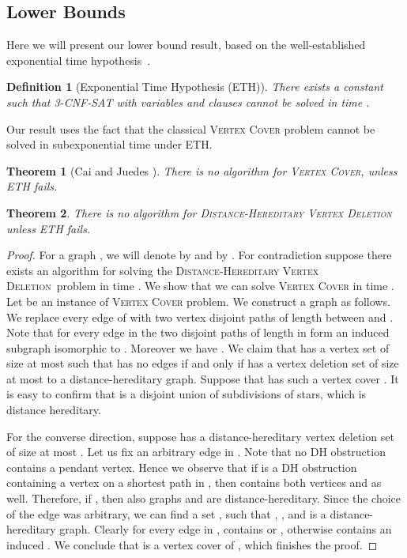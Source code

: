 \documentclass[11pt]{elsarticle}
\newtheorem{theorem}{Theorem}[section]
\newtheorem{definition}{Definition}
\newcommand{\DHVD}{\textsc{Distance-Hereditary Vertex Deletion}}
\begin{document}
\subsection{Lower Bounds}
Here we will present our lower bound result, based on the well-established exponential time hypothesis~\cite{ImpagliazzoRF2001}.

\begin{definition}[Exponential Time Hypothesis (ETH)]
 There exists a constant  such that \textsc{3-CNF-SAT} with  variables and  clauses cannot be solved in time .
\end{definition}

Our result uses the fact that the classical \textsc{Vertex Cover} problem cannot be solved in subexponential time under ETH.
  
\begin{theorem}[Cai and Juedes \cite{CaiJuedes03}]\label{thm:ethVC}
There is no  algorithm for \textsc{Vertex Cover}, unless ETH fails.
\end{theorem}

\begin{theorem}
\label{thm:main3}
There is no  algorithm for \DHVD\, unless ETH fails.
\end{theorem}
\begin{proof}
For a graph , we will denote  by  and  by .
For contradiction suppose there exists an algorithm for solving the \DHVD\ problem in time . We show that we can solve \textsc{Vertex Cover} in time . Let  be an instance of \textsc{Vertex Cover} problem. We construct a graph  as follows. We replace every edge  of  with two vertex disjoint paths of length  between  and . Note that for every edge  in  the two disjoint paths of length  in  form an induced subgraph isomorphic to . Moreover we have . We claim that  has a vertex set  of size at most  such that  has no edges if and only if  has a vertex deletion set of size at most  to a distance-hereditary graph. Suppose that  has such a vertex cover . It is easy to confirm that  is a  disjoint union of subdivisions of stars, which is distance hereditary. 

For the converse direction, suppose  has a distance-hereditary vertex deletion set  of size at most . 
Let us fix an arbitrary edge  in . Note that no DH obstruction contains a pendant vertex. Hence we observe that if  is a DH obstruction containing a vertex  on a shortest  path in , then  contains both vertices  and  as well. Therefore, if , then also graphs  and  are distance-hereditary. Since the choice of the edge  was arbitrary, we can find a set , such that , , and  is a distance-hereditary graph. Clearly for every edge  in ,  contains  or , otherwise  contains an induced . We conclude that  is a vertex cover of , which finishes the proof. 
\end{proof}
\end{document}

